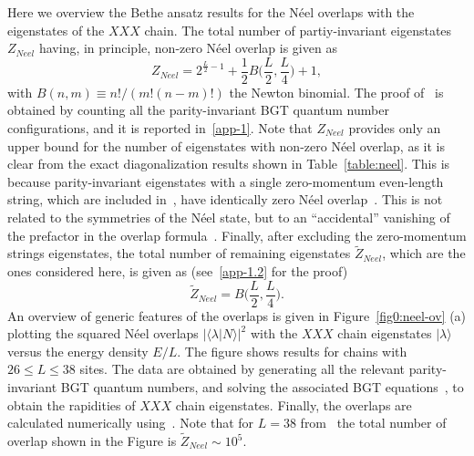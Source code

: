 \documentclass[11pt]{iopart}
\begin{document}
Here we overview the Bethe ansatz results for the N\'eel overlaps with the 
eigenstates of the $XXX$ chain. The total number of partiy-invariant 
eigenstates $Z_{Neel}$ having, in principle, non-zero N\'eel overlap is given 
as 
%
\begin{equation}
\label{zneel1}
Z_{Neel}=2^{\frac{L}{2}-1}+\frac{1}{2}B\Big(\frac{L}{2},\frac{L}{4}\Big)+1, 
\end{equation}
%
with $B(n,m)\equiv n!/(m!(n-m)!)$ the Newton binomial. The proof of~ 
is obtained by counting all the parity-invariant BGT quantum number configurations, 
and it is reported in~\ref{app-1}. Note that $Z_{Neel}$ provides only an upper 
bound for the number of eigenstates with non-zero N\'eel overlap, as it is clear 
from the exact diagonalization results shown in Table~\ref{table:neel}. This is 
because parity-invariant eigenstates with a single zero-momentum even-length 
string, which are included in~, have identically zero N\'eel 
overlap~\cite{brockmann-2014}. This is not related to the symmetries of the N\'eel 
state, but to an ``accidental'' vanishing of the prefactor in the overlap 
formula~. Finally, after excluding the zero-momentum strings 
eigenstates, the total number of remaining eigenstates $\widetilde Z_{Neel}$, 
which are the ones considered here, is given as (see~\ref{app-1.2} for the proof) 
%
\begin{equation}
\label{ztilde}
\widetilde Z_{Neel}=B\Big(\frac{L}{2},\frac{L}{4}\Big).
\end{equation}
%
An overview of generic features of the overlaps is given in Figure~\ref{fig0:neel-ov} 
(a) plotting the squared N\'eel overlaps $|\langle\lambda|N\rangle|^2$ with the $XXX$ 
chain eigenstates $|\lambda\rangle$ versus the energy density $E/L$. The figure shows 
results for chains with $26\le L\le 38$ sites. The data are obtained by generating all 
the relevant parity-invariant BGT quantum numbers, and solving the associated BGT 
equations~, to obtain the rapidities of $XXX$ chain eigenstates. Finally, 
the overlaps are calculated numerically using~. Note that for $L=38$ 
from~ the total number of overlap shown in the Figure is $\widetilde Z_{Neel}
\sim 10^5$. 
\end{document}
